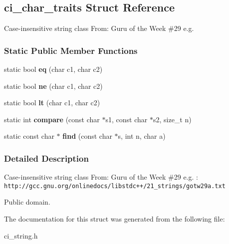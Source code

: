 \subsection{ci\_\-char\_\-traits Struct Reference}
\label{a00016}


Case-\/insensitive string class From: Guru of the Week \#29 e.g.  
\subsubsection*{Static Public Member Functions}
\begin{DoxyCompactItemize}
\item 
static bool {\bfseries eq} (char c1, char c2)\label{a00016_ab7affd067081a44149cbdb5ddbd6388a}

\item 
static bool {\bfseries ne} (char c1, char c2)\label{a00016_a37eaee352a01e9557c164f58c7d0ae36}

\item 
static bool {\bfseries lt} (char c1, char c2)\label{a00016_a2658e35e7ccccd43faea5922aeea2855}

\item 
static int {\bfseries compare} (const char $\ast$s1, const char $\ast$s2, size\_\-t n)\label{a00016_aee3f3e6230d9e98ed5a820bb7d05c443}

\item 
static const char $\ast$ {\bfseries find} (const char $\ast$s, int n, char a)\label{a00016_a5968fc0112d4a24e2fa74da3700357b1}

\end{DoxyCompactItemize}


\subsubsection{Detailed Description}
Case-\/insensitive string class From: Guru of the Week \#29 e.g. : {\tt http://gcc.gnu.org/onlinedocs/libstdc++/21\_\-strings/gotw29a.txt}

Public domain. 

The documentation for this struct was generated from the following file:\begin{DoxyCompactItemize}
\item 
ci\_\-string.h\end{DoxyCompactItemize}
